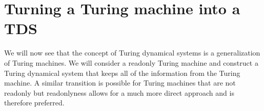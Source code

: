 \section{Turning a Turing machine into a TDS} \label{tm_to_tds}

We will now see that the concept of Turing dynamical systems is a generalization of Turing machines.
We will consider a readonly Turing machine and construct a Turing dynamical system that keeps all of the information from the Turing machine.
A similar transition is possible for Turing machines that are not readonly but readonlyness allows for a much more direct approach and is therefore preferred.





